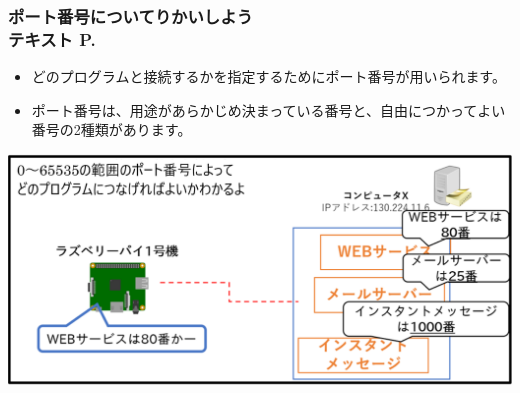 \begin{frame}[fragile]
	\frametitle{\large{ポート番号についてりかいしよう\\テキスト P.\pageref{1:P:slide_p17}}~~~}
    \begin{itemize}\small
                \item どのプログラムと接続するかを指定するためにポート番号が用いられます。
                \item ポート番号は、用途があらかじめ決まっている番号と、自由につかってよい番号の2種類があります。
            \end{itemize}
			\begin{minipage}{\textwidth}
                {\upshape
                  \includegraphics[width=\textwidth]{slide07-img/slide07-img012.png}}
            \end{minipage}
\end{frame}

